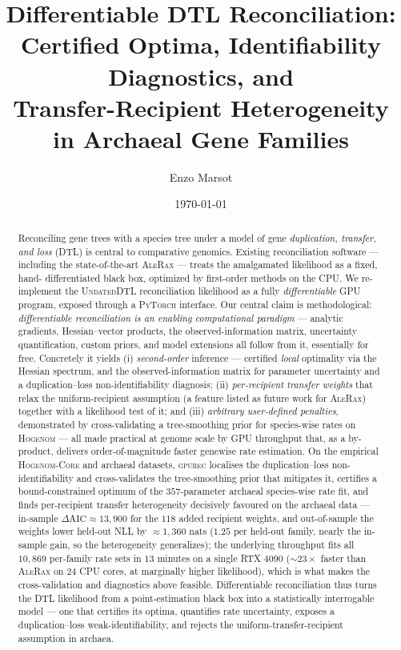 \documentclass[11pt]{article}
\title{\textbf{Differentiable DTL Reconciliation:\\
Certified Optima, Identifiability Diagnostics, and\\
Transfer-Recipient Heterogeneity in Archaeal Gene Families}}
\author{Enzo Marsot}
\date{\today}
\newcommand{\toolname}{\textsc{gpurec}\xspace}
\begin{document}
\maketitle

\begin{abstract}
\noindent
Reconciling gene trees with a species tree under a model of gene
\emph{duplication, transfer, and loss} (DTL) is central to comparative
genomics. Existing reconciliation software --- including the state-of-the-art
\textsc{AleRax} --- treats the amalgamated likelihood as a fixed, hand-%
differentiated black box, optimized by first-order methods on the CPU. We
re-implement the \textsc{UndatedDTL} reconciliation likelihood as a fully
\emph{differentiable} GPU program, exposed through a \textsc{PyTorch} interface.
Our central claim is methodological: \emph{differentiable reconciliation is an
enabling computational paradigm} --- analytic gradients, Hessian--vector products,
the observed-information matrix, uncertainty quantification, custom priors, and
model extensions all follow from it, essentially for free. Concretely it yields
(i) \emph{second-order} inference --- certified \emph{local} optimality via the
Hessian spectrum, and the observed-information matrix for parameter uncertainty and
a duplication--loss non-identifiability diagnosis; (ii) \emph{per-recipient transfer
weights} that relax the uniform-recipient assumption (a feature listed as future
work for \textsc{AleRax}) together with a likelihood test of it; and (iii)
\emph{arbitrary user-defined penalties}, demonstrated by cross-validating a
tree-smoothing prior for species-wise rates on \textsc{Hogenom} --- all made
practical at genome scale by GPU throughput that, as a by-product, delivers
order-of-magnitude faster genewise rate estimation. On the empirical
\textsc{Hogenom-Core} and archaeal datasets, \toolname localises the
duplication--loss non-identifiability and cross-validates the tree-smoothing prior
that mitigates it, certifies a bound-constrained optimum of the $357$-parameter
archaeal species-wise rate fit, and finds per-recipient transfer heterogeneity
decisively favoured on the archaeal data --- in-sample $\Delta\mathrm{AIC}\approx
13{,}900$ for the $118$ added recipient weights, and out-of-sample the weights lower
held-out NLL by $\approx\!1{,}360$ nats ($1.25$ per held-out family, nearly the
in-sample gain, so the heterogeneity generalizes); the underlying throughput fits
all $10{,}869$
per-family rate sets in $13$ minutes on a single \textsc{RTX 4090}
($\sim\!23\times$ faster than \textsc{AleRax} on $24$ CPU cores, at marginally
higher likelihood), which is what makes the cross-validation and diagnostics above
feasible. Differentiable reconciliation thus turns the DTL
likelihood from a point-estimation black box into a statistically interrogable
model --- one that certifies its optima, quantifies rate uncertainty, exposes a
duplication--loss weak-identifiability, and rejects the uniform-transfer-recipient
assumption in archaea.
\end{abstract}
\end{document}
